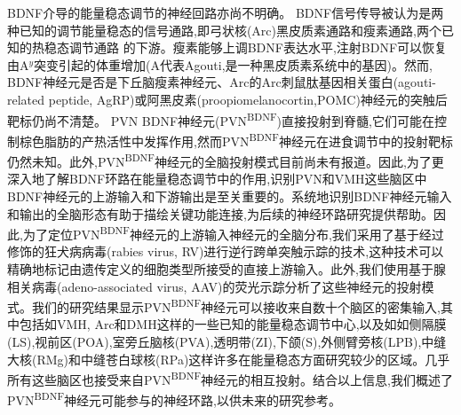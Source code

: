 BDNF介导的能量稳态调节的神经回路亦尚不明确。 BDNF信号传导被认为是两种已知的调节能量稳态的信号通路,即弓状核(Arc)黑皮质素通路\citep{xu2003brain}和瘦素通路\citep{liao2012dendritically},两个已知的热稳态调节通路
\citep{waterson2015neuronal, krashes2016melanocortin}的下游。瘦素能够上调BDNF表达水平,注射BDNF可以恢复由A$^{y}$突变引起的体重增加(A代表Agouti,是一种黑皮质素系统中的基因)。然而, BDNF神经元是否是下丘脑瘦素神经元、Arc的Arc刺鼠肽基因相关蛋白(agouti-related peptide, AgRP)或阿黑皮素(proopiomelanocortin,POMC)神经元的突触后靶标仍尚不清楚。 PVN BDNF神经元(PVN\textsuperscript{BDNF})直接投射到脊髓,它们可能在控制棕色脂肪的产热活性中发挥作用,然而PVN\textsuperscript{BDNF}神经元在进食调节中的投射靶标仍然未知\citep{an2015discrete}。此外,PVN\textsuperscript{BDNF}神经元的全脑投射模式目前尚未有报道。因此,为了更深入地了解BDNF环路在能量稳态调节中的作用,识别PVN和VMH这些脑区中BDNF神经元的上游输入和下游输出是至关重要的。系统地识别BDNF神经元输入和输出的全脑形态有助于描绘关键功能连接,为后续的神经环路研究提供帮助。因此,为了定位PVN\textsuperscript{BDNF}神经元的上游输入神经元的全脑分布,我们采用了基于经过修饰的狂犬病病毒(rabies virus, RV)进行逆行跨单突触示踪的技术,这种技术可以精确地标记由遗传定义的细胞类型所接受的直接上游输入\citep{wickersham2007monosynaptic}。此外,我们使用基于腺相关病毒(adeno-associated virus, AAV)的荧光示踪分析了这些神经元的投射模式。我们的研究结果显示PVN\textsuperscript{BDNF}神经元可以接收来自数十个脑区的密集输入,其中包括如VMH, Arc和DMH这样的一些已知的能量稳态调节中心,以及如如侧隔膜(LS),视前区(POA),室旁丘脑核(PVA),透明带(ZI),下颌(S),外侧臂旁核(LPB),中缝大核(RMg)和中缝苍白球核(RPa)这样许多在能量稳态方面研究较少的区域。几乎所有这些脑区也接受来自PVN\textsuperscript{BDNF}神经元的相互投射。结合以上信息,我们概述了PVN\textsuperscript{BDNF}神经元可能参与的神经环路,以供未来的研究参考。
